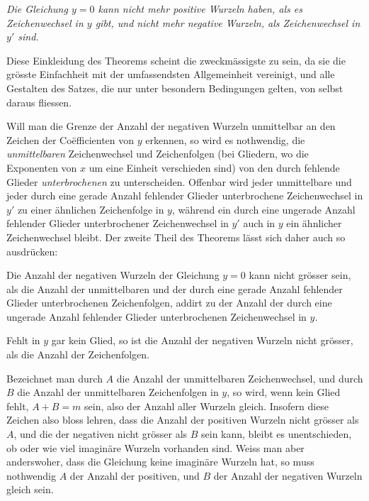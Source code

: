 \documentclass[14pt]{memoir}
\theoremstyle{plain}
\theoremstyle{remark}
\begin{document}
\textit{Die Gleichung \(y=0\) kann nicht mehr positive Wurzeln haben, als es Zeichenwechsel in \(y\) gibt, und nicht mehr negative Wurzeln, als Zeichenwechsel in \(y'\) sind.}

Diese Einkleidung des Theorems scheint die zweckmässigste zu sein, da sie die grösste Einfachheit mit der umfassendsten Allgemeinheit vereinigt, und alle Gestalten des Satzes, die nur unter besondern Bedingungen gelten, von selbst daraus fliessen.

Will man die Grenze der Anzahl der negativen Wurzeln unmittelbar an den Zeichen der Coëfficienten von \(y\) erkennen, so wird es nothwendig, die \textit{unmittelbaren} Zeichenwechsel und Zeichenfolgen (bei Gliedern, wo die Exponenten von \(x\) um eine Einheit verschieden sind) von den durch fehlende Glieder \textit{unterbrochenen} zu unterscheiden. Offenbar wird jeder unmittelbare und jeder durch eine gerade Anzahl fehlender Glieder unterbrochene Zeichenwechsel in \(y'\) zu einer ähnlichen Zeichenfolge in \(y\), während ein durch eine ungerade Anzahl fehlender Glieder unterbrochener Zeichenwechsel in \(y'\) auch in \(y\) ein ähnlicher Zeichenwechsel bleibt. Der zweite Theil des Theorems lässt sich daher auch so ausdrücken:

Die Anzahl der negativen Wurzeln der Gleichung \(y=0\) kann nicht grösser sein, als die Anzahl der unmittelbaren und der durch eine gerade Anzahl fehlender Glieder unterbrochenen Zeichenfolgen, addirt zu der Anzahl der durch eine ungerade Anzahl fehlender Glieder unterbrochenen Zeichenwechsel in \(y\).

Fehlt in \(y\) gar kein Glied, so ist die Anzahl der negativen Wurzeln nicht grösser, als die Anzahl der Zeichenfolgen.

Bezeichnet man durch \(A\) die Anzahl der unmittelbaren Zeichenwechsel, und durch \(B\) die Anzahl der unmittelbaren Zeichenfolgen in \(y\), so wird, wenn kein Glied fehlt, \(A+B=m\) sein, also der Anzahl aller Wurzeln gleich. Insofern diese Zeichen also bloss lehren, dass die Anzahl der positiven Wurzeln nicht grösser als \(A\), und die der negativen nicht grösser als \(B\) sein kann, bleibt es unentschieden, ob oder wie viel imaginäre Wurzeln vorhanden sind. Weiss man aber anderswoher, dass die Gleichung keine imaginäre Wurzeln hat, so muss nothwendig \(A\) der Anzahl der positiven, und \(B\) der Anzahl der negativen Wurzeln gleich sein.
\end{document}
